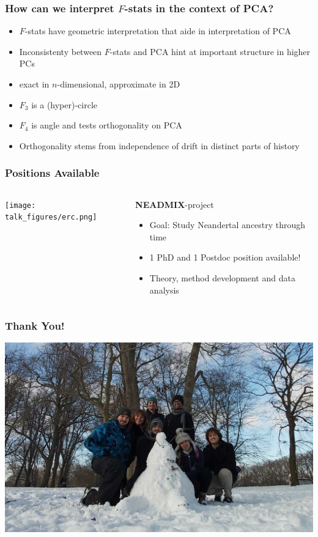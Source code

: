 \documentclass[11pt]{beamer}
\begin{document}
\begin{frame}
	\frametitle{How can we interpret $F$-stats in the context of PCA?}
	\begin{itemize}[<+->]
		\item $F$-stats have geometric interpretation that aide in interpretation of PCA
		\item Inconsistenty between $F$-stats and PCA hint at important structure in higher PCs
		\item exact in $n$-dimensional, approximate in 2D
		\item $F_3$ is a (hyper)-circle
		\item $F_4$ is angle and tests orthogonality on PCA
		\item Orthogonality stems from independence of drift in distinct parts of history
	\end{itemize}
\end{frame}

\begin{frame}
	\frametitle{Positions Available}
	\begin{columns}
		\begin{column}{0.3\textwidth}
			\texttt{[image: talk\_figures/erc.png]}
		\end{column}
		\begin{column}{0.7\textwidth}
			\textbf{NEADMIX}-project
			\begin{itemize}
				\item Goal: Study Neandertal ancestry through time
				\item 1 PhD and 1 Postdoc position available!
				\item Theory, method development and data analysis
			\end{itemize}
		\end{column}
	\end{columns}
\end{frame}


\begin{frame}
	\frametitle{Thank You!}
	\includegraphics[width=\textwidth]{figures/group_photo.png}
\end{frame}
\end{document}
